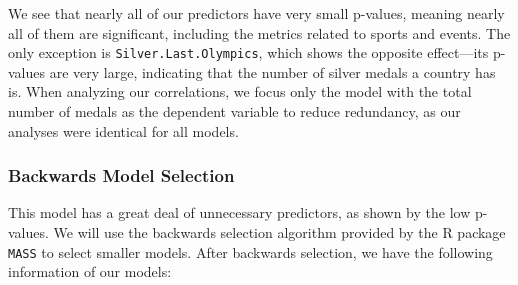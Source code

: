 \documentclass{mcmthesis}
\begin{document}
We see that nearly all of our predictors have very small p-values, meaning nearly all of them are significant, including the metrics related to sports and events. The only exception is \texttt{Silver.Last.Olympics}, which shows the opposite effect---its p-values are very large, indicating that the number of silver medals a country has is. When analyzing our correlations, we focus only the model with the total number of medals as the dependent variable to reduce redundancy, as our analyses were identical for all models. 

\subsubsection{Backwards Model Selection}

This model has a great deal of unnecessary predictors, as shown by the low p-values. We will use the backwards selection algorithm provided by the R package \texttt{MASS} to select smaller models. After backwards selection, we have the following information of our models:
\end{document}
